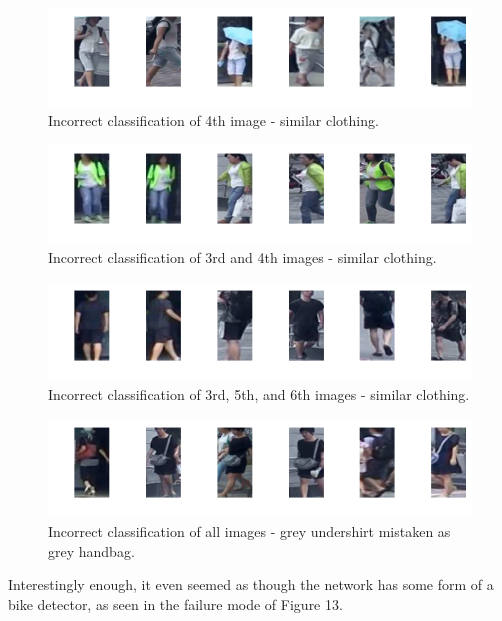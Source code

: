 \begin{figure}[H]
    \centering \includegraphics[width=0.8\columnwidth]{figures/person_reid/example1_similar.png}
    \caption{Incorrect classification of 4th image - similar clothing.}
\end{figure}

\begin{figure}[H]
    \centering \includegraphics[width=0.8\columnwidth]{figures/person_reid/example3_similar.png}
    \caption{Incorrect classification of 3rd and 4th images - similar clothing.}
\end{figure}

\begin{figure}[H]
    \centering \includegraphics[width=0.8\columnwidth]{figures/person_reid/example5_reasonable_mistake.png}
    \caption{Incorrect classification of 3rd, 5th, and 6th images - similar clothing.}
\end{figure}

\begin{figure}[H]
    \centering \includegraphics[width=0.8\columnwidth]{figures/person_reid/example9_no_matches.png}
    \caption{Incorrect classification of all images - grey undershirt mistaken as grey handbag.}
\end{figure}

Interestingly enough, it even seemed as though the network has some form of a bike detector, as seen in the failure mode of Figure 13.

